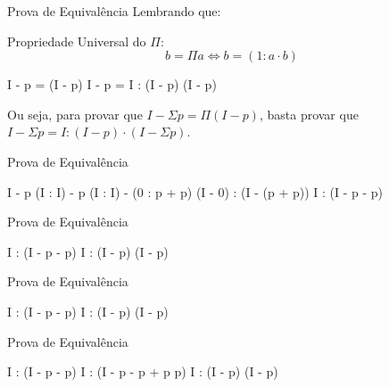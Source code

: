 
\begin{frame}{Prova de Equivalência}
  Lembrando que:

  \begin{minipage}[t]{0.45\textwidth}
    Propriedade Universal do $\Pi$:
    \vspace{0.2cm}
    \[b = \Pi a \iff b = (1 : a \cdot b)\]
  \end{minipage}
  \pause
  \hfill
  \vrule
  \hfill
  \begin{minipage}[t]{0.45\textwidth}
    \begin{calculation}[\calciff]
      I - \Sigma p = \Pi (I - p)
      I - \Sigma p = I : (I - p) \cdot (I - \Sigma p)
    \end{calculation}
  \end{minipage}
  \vfill
  \pause
  \vfill
  Ou seja, para provar que $I - \Sigma p = \Pi (I - p)$, basta provar que $I - \Sigma p = I : (I - p) \cdot (I - \Sigma p)$.
  \vfill
\end{frame}

\begin{frame}{Prova de Equivalência}
  \begin{calculation}[=]
    I - \Sigma p \pause
     \pause
    (I : I) - \Sigma p \pause
     \pause
    (I : I) - (0 : p + \Sigma p) \pause
     \pause
    (I - 0) : (I - (p + \Sigma p)) \pause
     \pause
    I : (I - p - \Sigma p)
  \end{calculation}
\end{frame}

\begin{frame}{Prova de Equivalência}
  \begin{calculation}[=]
    I : (I - p - \Sigma p)
    \vphantom{a}
    I : (I - p) \cdot (I - \Sigma p)
  \end{calculation}
\end{frame}

\begin{frame}{Prova de Equivalência}
  \begin{calculation}[=]
    I : (I - p - \Sigma p)
    \vphantom{a}
    I : (I - p) \cdot (I - \Sigma p)
  \end{calculation}
\end{frame}

\begin{frame}{Prova de Equivalência}
  \begin{calculation}[=]
    I : (I - p - \Sigma p)
    I : (I - p - \Sigma p + p \Sigma p)
    I : (I - p) \cdot (I - \Sigma p)
  \end{calculation}
\end{frame}

